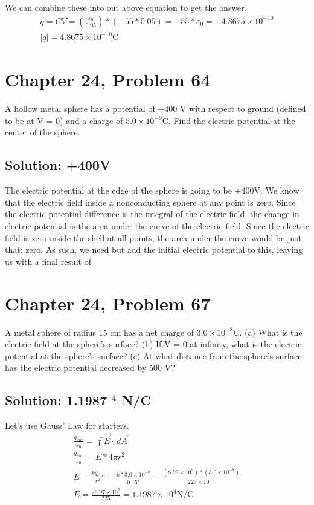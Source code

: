 \documentclass[12pt]{article}
\begin{document}
We can combine these into out above equation to get the answer.
\begin{gather*}
    q   =   CV
        =   (\frac{\varepsilon_0}{0.05}) * (-55 * 0.05)
        =   -55 * \varepsilon_0
        =   -4.8675 \times 10^{-10}\\
    |q| =   \boxed{4.8675 \times 10^{-10} \unit{\coulomb}}
\end{gather*}

\pagebreak
\section{Chapter 24, Problem 64}
A hollow metal sphere has a potential of +400 V with respect to ground (defined to be at V = 0) and a charge of $5.0 \times 10^{-9} \unit{\coulomb}$. Find the electric potential at the center of the sphere.

\subsection*{Solution: +400V}
The electric potential at the edge of the sphere is going to be $+400 \unit{\volt}$.
We know that the electric field inside a nonconducting sphere at any point is zero. 
Since the electric potential difference is the integral of the electric field, the change in electric potential is the area under the curve of the electric field.
Since the electric field is zero inside the shell at all points, the area under the curve would be just that: zero.
As such, we need but add the initial electric potential to this, leaving us with a final result of \boxed{+400 \unit{\volt}}

\pagebreak
\section{Chapter 24, Problem 67}
A metal sphere of radius 15 cm has a net charge of $3.0 \times 10^{-8} \unit{\coulomb}$. (a) What is the electric field at the sphere's surface? (b) If V = 0 at infinity, what is the electric potential at the sphere's surface? (c) At what distance from the sphere's surface has the electric potential decreased by 500 V?

\subsection{Solution: 1.1987 $^4$ N/C}
Let's use Gauss' Law for starters. 
\begin{gather*}
    \frac{q_{enc}}{\varepsilon_0} = \oint \vec{E} \cdot\,d\vec{A}\\
    \frac{q_{enc}}{\varepsilon_0} = E * 4\pi r^2\\
    E   =   \frac{kq_{enc}}{r^2}
        =   \frac{k*3.0 \times 10^{-8}}{0.15^2}
        =   \frac{(8.99 \times 10^9) * (3.0 \times 10^{-8})}{225 \times 10^{-4}}\\
    E   =   \frac{26.97 \times 10^{5}}{225}
        =   \boxed{1.1987 \times 10^4 \unit{\newton/\coulomb}}
\end{gather*}
\end{document}
